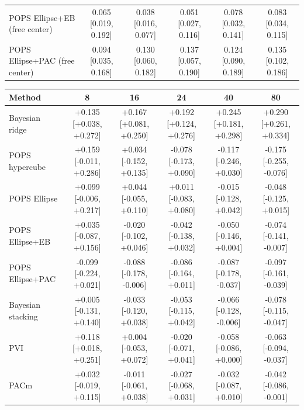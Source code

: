 \begin{tabular}{lccccc}
POPS Ellipse+EB (free center) & 0.065 {\scriptsize[0.019, 0.192]} & 0.038 {\scriptsize[0.016, 0.077]} & 0.051 {\scriptsize[0.027, 0.116]} & 0.078 {\scriptsize[0.032, 0.141]} & 0.083 {\scriptsize[0.034, 0.115]} \\
POPS Ellipse+PAC (free center) & 0.094 {\scriptsize[0.035, 0.168]} & 0.130 {\scriptsize[0.060, 0.182]} & 0.137 {\scriptsize[0.057, 0.190]} & 0.124 {\scriptsize[0.090, 0.189]} & 0.135 {\scriptsize[0.102, 0.186]} \\
\bottomrule
\end{tabular}

\begin{tabular}{lccccc}
\toprule
Method & 8 & 16 & 24 & 40 & 80 \\
\midrule
Bayesian ridge & +0.135 {\scriptsize[+0.038, +0.272]} & +0.167 {\scriptsize[+0.081, +0.250]} & +0.192 {\scriptsize[+0.124, +0.276]} & +0.245 {\scriptsize[+0.181, +0.298]} & +0.290 {\scriptsize[+0.261, +0.334]} \\
POPS hypercube & +0.159 {\scriptsize[-0.011, +0.286]} & +0.034 {\scriptsize[-0.152, +0.135]} & -0.078 {\scriptsize[-0.173, +0.090]} & -0.117 {\scriptsize[-0.246, +0.030]} & -0.175 {\scriptsize[-0.255, -0.076]} \\
POPS Ellipse & +0.099 {\scriptsize[-0.006, +0.217]} & +0.044 {\scriptsize[-0.055, +0.110]} & +0.011 {\scriptsize[-0.083, +0.080]} & -0.015 {\scriptsize[-0.128, +0.042]} & -0.048 {\scriptsize[-0.125, +0.015]} \\
POPS Ellipse+EB & +0.035 {\scriptsize[-0.087, +0.156]} & -0.020 {\scriptsize[-0.102, +0.046]} & -0.042 {\scriptsize[-0.138, +0.032]} & -0.050 {\scriptsize[-0.146, +0.004]} & -0.074 {\scriptsize[-0.141, -0.007]} \\
POPS Ellipse+PAC & -0.099 {\scriptsize[-0.224, +0.021]} & -0.088 {\scriptsize[-0.178, -0.006]} & -0.086 {\scriptsize[-0.164, +0.011]} & -0.087 {\scriptsize[-0.178, -0.037]} & -0.097 {\scriptsize[-0.161, -0.039]} \\
Bayesian stacking & +0.005 {\scriptsize[-0.131, +0.140]} & -0.033 {\scriptsize[-0.120, +0.038]} & -0.053 {\scriptsize[-0.115, +0.042]} & -0.066 {\scriptsize[-0.128, -0.006]} & -0.078 {\scriptsize[-0.115, -0.047]} \\
PVI & +0.118 {\scriptsize[+0.018, +0.251]} & +0.004 {\scriptsize[-0.053, +0.072]} & -0.020 {\scriptsize[-0.071, +0.041]} & -0.058 {\scriptsize[-0.086, +0.000]} & -0.063 {\scriptsize[-0.094, -0.037]} \\
PACm & +0.032 {\scriptsize[-0.019, +0.115]} & -0.011 {\scriptsize[-0.061, +0.038]} & -0.027 {\scriptsize[-0.068, +0.031]} & -0.032 {\scriptsize[-0.087, +0.010]} & -0.042 {\scriptsize[-0.086, -0.001]} \\

\end{tabular}
